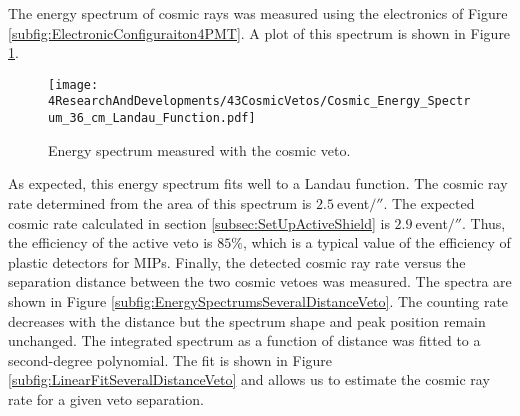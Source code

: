 The energy spectrum of cosmic rays was measured using the electronics of Figure \ref{subfig:ElectronicConfiguraiton4PMT}. A plot of this spectrum is shown in Figure \ref{fig:EnergySpectrumCosmicVeto}. 
\begin{figure}[h]
\centering
\texttt{[image: 4ResearchAndDevelopments/43CosmicVetos/Cosmic\_Energy\_Spectrum\_36\_cm\_Landau\_Function.pdf]}
\caption{Energy spectrum measured with the cosmic veto.\label{fig:EnergySpectrumCosmicVeto}}
\end{figure}
As expected, this energy spectrum fits well to a Landau function. The cosmic ray rate determined from the area of this spectrum is $2.5~$event$/\second$. The expected cosmic rate calculated in section \ref{subsec:SetUpActiveShield} is $2.9~$event$/\second$. Thus, the efficiency of the active veto is $85\%$, which is a typical value of the efficiency of plastic detectors for MIPs. Finally, the detected cosmic ray rate versus the separation distance between the two cosmic vetoes was measured. The spectra are shown in Figure \ref{subfig:EnergySpectrumsSeveralDistanceVeto}. The counting rate decreases with the distance but the spectrum shape and peak position remain unchanged. The integrated spectrum as a function of distance was fitted to a second-degree polynomial. The fit is shown in Figure \ref{subfig:LinearFitSeveralDistanceVeto} and allows us to estimate the cosmic ray rate for a given veto separation.





